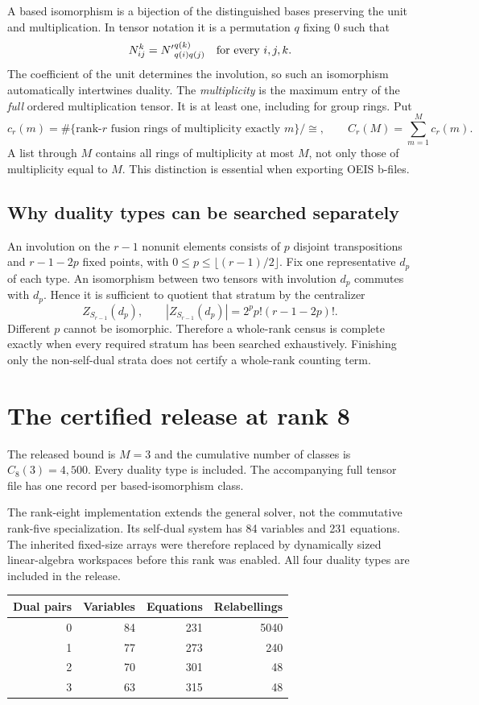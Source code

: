 \documentclass[11pt,a4paper]{article}
\theoremstyle{definition}\newtheorem{definition}[theorem]{Definition}\newtheorem{remark}[theorem]{Remark}
\begin{document}
A based isomorphism is a bijection of the distinguished bases preserving the
unit and multiplication. In tensor notation it is a permutation $q$ fixing $0$
such that
\[
 N_{ij}^{k}={N'}_{q(i)q(j)}^{q(k)}\quad\hbox{for every }i,j,k.
\]
The coefficient of the unit determines the involution, so such an isomorphism
automatically intertwines duality. The \emph{multiplicity} is the maximum entry
of the \emph{full} ordered multiplication tensor. It is at least one, including
for group rings. Put
\[
 c_r(m)=\#\{\text{rank-}r\text{ fusion rings of multiplicity exactly }m\}/\cong,
 \qquad C_r(M)=\sum_{m=1}^{M}c_r(m).
\]
A list through $M$ contains all rings of multiplicity at most $M$, not only
those of multiplicity equal to $M$. This distinction is essential when exporting
OEIS b-files.

\subsection{Why duality types can be searched separately}
An involution on the $r-1$ nonunit elements consists of $p$ disjoint transpositions
and $r-1-2p$ fixed points, with $0\leq p\leq\lfloor(r-1)/2\rfloor$. Fix one
representative $d_p$ of each type. An isomorphism between two tensors with
involution $d_p$ commutes with $d_p$. Hence it is sufficient to quotient that
stratum by the centralizer
\[
 Z_{S_{r-1}}(d_p),\qquad |Z_{S_{r-1}}(d_p)|=2^p p!(r-1-2p)!.
\]
Different $p$ cannot be isomorphic. Therefore a whole-rank census is complete
exactly when every required stratum has been searched exhaustively. Finishing
only the non-self-dual strata does not certify a whole-rank counting term.
\section{The certified release at rank 8}
The released bound is $M=3$ and the cumulative number of classes is $C_{8}(3)=4,500$. Every duality type is included. The accompanying full tensor file has one record per based-isomorphism class.

The rank-eight implementation extends the general solver, not the commutative rank-five specialization. Its self-dual system has 84 variables and 231 equations. The inherited fixed-size arrays were therefore replaced by dynamically sized linear-algebra workspaces before this rank was enabled. All four duality types are included in the release.

\begin{center}\begin{tabular}{rrrr}\toprule Dual pairs & Variables & Equations & Relabellings\\\midrule
0 & 84 & 231 & 5040\\
1 & 77 & 273 & 240\\
2 & 70 & 301 & 48\\
3 & 63 & 315 & 48\\
\bottomrule\end{tabular}\end{center}
\end{document}
